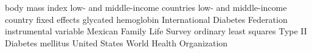 \newcommand{\truncateit}[1]{\truncate{0.8\textwidth}{#1}}
\newcommand{\scititle}[1]{\title[\truncateit{#1}]{#1}}
\usepackage[T1]{fontenc}
\providecommand{\tabularnewline}{\\}
\usepackage[nolist]{acronym}
 {body mass index}  
 {low- and middle-income countries}  
 {low- and middle-income country}  
 {fixed effects}  
 {glycated hemoglobin}  
 {International Diabetes Federation}  
 {instrumental variable}  
 {Mexican Family Life Survey}  
 {ordinary least squares}  
 {Type II Diabetes mellitus}  
 {United States}
 {World Health Organization}  
\usepackage{longtable}
\usepackage{booktabs}
\usepackage{multirow}
\usepackage{graphicx}
\newcommand{\sym}[1]{\ensuremath{^{#1}}} %

\usepackage{natbib}

 

\usepackage{geometry}
\geometry{
letterpaper,
left=20mm,
right=20mm,
top=20mm,
bottom=30mm,
}   
\usepackage[section]{placeins}
  
  

  

  
  
  
  
  
  
  
  
  
  
  
  
  
  
  
  
  
  